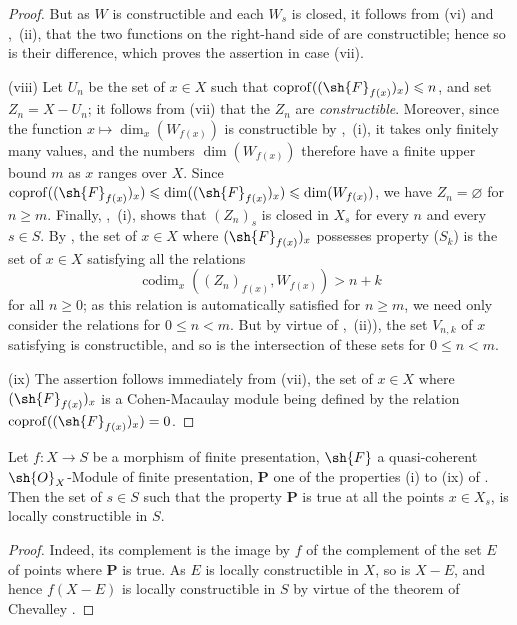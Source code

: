 \begin{proof}
But as $W$ is constructible  and each $W_s$ is closed, it follows from (vi) and ,~(ii), that the two functions on the right-hand side of  are constructible; hence so is their difference, which proves the assertion in case (vii).

(viii) Let $U_n$ be the set of $x\in X$ such that $\operatorname{coprof}((\sh{F}_{f(x)})_x)\leqslant n$, and set $Z_n=X-U_n$; it follows from (vii) that the $Z_n$ are \emph{constructible}.
Moreover, since the function $x\mapsto\dim_x(W_{f(x)})$ is constructible by ,~(i), it takes only finitely many values, and the numbers $\dim(W_{f(x)})$ therefore have a finite upper bound $m$ as $x$ ranges over $X$.
Since $\operatorname{coprof}((\sh{F}_{f(x)})_x)\leqslant\dim((\sh{F}_{f(x)})_x)\leqslant\dim(W_{f(x)})$, we have $Z_n=\varnothing$ for $n\geqslant m$.
Finally, ,~(i), shows that $(Z_n)_s$ is closed in $X_s$ for every $n$ and every $s\in S$.
By , the set of $x\in X$ where $(\sh{F}_{f(x)})_x$ possesses property ($S_k$) is the set of $x\in X$ satisfying all the relations
\begin{equation}
\tag{9.9.2.2}
\label{IV.9.9.2.2}
  \operatorname{codim}_x((Z_n)_{f(x)},W_{f(x)})>n+k
\end{equation}
for all $n\geqslant 0$; as this relation is automatically satisfied for $n\geqslant m$, we need only consider the relations  for $0\leqslant n<m$.
But by virtue of ,~(ii)), the set $V_{n,k}$ of $x$ satisfying  is constructible, and so is the intersection of these sets for $0\leqslant n<m$.

(ix) The assertion follows immediately from (vii), the set of $x\in X$ where $(\sh{F}_{f(x)})_x$ is a Cohen-Macaulay module being defined by the relation $\operatorname{coprof}((\sh{F}_{f(x)})_x)=0$.
\end{proof}

\begin{corollary}[9.9.3]
\label{IV.9.9.3}
Let $f:X\to S$ be a morphism of finite presentation, $\sh{F}$ a quasi-coherent $\sh{O}_X$-Module of finite presentation, $\mathbf{P}$ one of the properties (i) to (ix) of .
Then the set of $s\in S$ such that the property $\mathbf{P}$ is true at all the points $x\in X_s$, is locally constructible in $S$.
\end{corollary}

\begin{proof}
\label{IV.9.9.3-proof}
Indeed, its complement is the image by $f$ of the complement of the set $E$ of points where $\mathbf{P}$ is true.
As $E$ is locally constructible in $X$, so is $X-E$, and hence $f(X-E)$ is locally constructible in $S$ by virtue of the theorem of Chevalley .
\end{proof}


